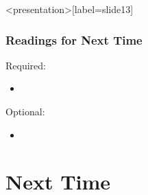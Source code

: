 \begin{frame}<presentation>[label=slide13]
    \frametitle{Readings for Next Time}
        Required:
        \begin{itemize}
            \item 
        \end{itemize}
        Optional:
        \begin{itemize}
            \item 
        \end{itemize}
\end{frame}





\section{Next Time}\label{sec:next_time} %





